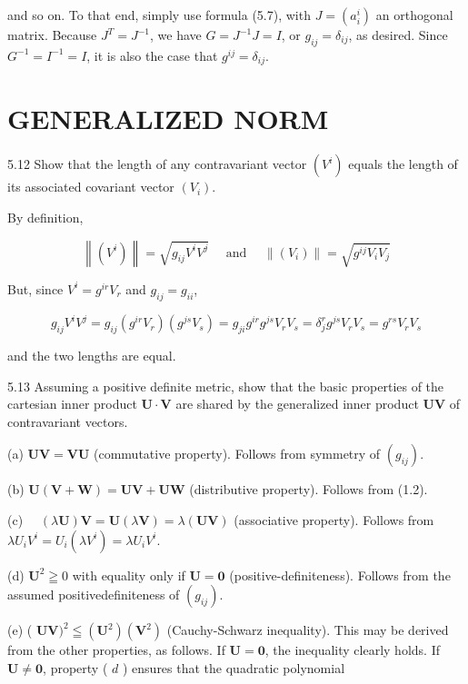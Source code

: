 \documentclass[10pt]{article}
\begin{document}
and so on. To that end, simply use formula (5.7), with $J=\left(a_{i}^{i}\right)$ an orthogonal matrix. Because $J^{T}=J^{-1}$, we have $G=J^{-1} J=I$, or $g_{i j}=\delta_{i j}$, as desired. Since $G^{-1}=I^{-1}=I$, it is also the case that $g^{i j}=\delta_{i j}$.

\section*{GENERALIZED NORM}
5.12 Show that the length of any contravariant vector $\left(V^{i}\right)$ equals the length of its associated covariant vector $\left(V_{i}\right)$.

By definition,

$$
\left\|\left(V^{i}\right)\right\|=\sqrt{g_{i j} V^{i} V^{j}} \quad \text { and } \quad\left\|\left(V_{i}\right)\right\|=\sqrt{g^{i j} V_{i} V_{j}}
$$

But, since $V^{i}=g^{i r} V_{r}$ and $g_{i j}=g_{i i}$,

$$
g_{i j} V^{i} V^{j}=g_{i j}\left(g^{i r} V_{r}\right)\left(g^{j s} V_{s}\right)=g_{j i} g^{i r} g^{j s} V_{r} V_{s}=\delta_{j}^{r} g^{j s} V_{r} V_{s}=g^{r s} V_{r} V_{s}
$$

and the two lengths are equal.

5.13 Assuming a positive definite metric, show that the basic properties of the cartesian inner product $\mathbf{U} \cdot \mathbf{V}$ are shared by the generalized inner product $\mathbf{U V}$ of contravariant vectors.

(a) $\mathbf{U V}=\mathbf{V U}$ (commutative property). Follows from symmetry of $\left(g_{i j}\right)$.

(b) $\mathbf{U}(\mathbf{V}+\mathbf{W})=\mathbf{U V}+\mathbf{U W}$ (distributive property). Follows from (1.2).

(c) $\quad(\lambda \mathbf{U}) \mathbf{V}=\mathbf{U}(\lambda \mathbf{V})=\lambda(\mathbf{U V})$ (associative property). Follows from $\lambda U_{i} V^{i}=U_{i}\left(\lambda V^{i}\right)=\lambda U_{i} V^{i}$.

(d) $\mathbf{U}^{2} \geqq 0$ with equality only if $\mathbf{U}=\mathbf{0}$ (positive-definiteness). Follows from the assumed positivedefiniteness of $\left(g_{i j}\right)$.

(e) ( $\mathbf{U V})^{2} \leqq\left(\mathbf{U}^{2}\right)\left(\mathbf{V}^{2}\right)$ (Cauchy-Schwarz inequality). This may be derived from the other properties, as follows. If $\mathbf{U}=\mathbf{0}$, the inequality clearly holds. If $\mathbf{U} \neq \mathbf{0}$, property ( $d$ ) ensures that the quadratic polynomial
\end{document}
